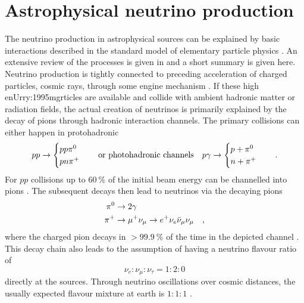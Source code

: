 \section{Astrophysical neutrino production}
  \label{chp:astro_nu_production}
The neutrino production in astrophysical sources can be explained by basic interactions described in the standard model of elementary particle physics \cite{Patrignani:2016xqp,Herrero:1998eq}.
An extensive review of the processes is given in \cite{Gaisser:1990vg,Gaisser:2016uoy,Grupen:2005rx} and a short summary is given here.
Neutrino production is tightly connected to preceding acceleration \cite{FermiShockAcc} of charged particles, cosmic rays, through some engine mechanism \cite{NetzerAGNReview,Beckmann:2013wte,Urry:1995mg}.
If these high enUrry:1995mgrticles are available and collide with ambient hadronic matter or radiation fields, the actual creation of neutrinos is primarily explained by the decay of pions through hadronic interaction channels.
The primary collisions can either happen in protohadronic
\begin{equation}
  p p \rightarrow
    \begin{cases}
      p p \pi^0 \\
      p n \pi^+
    \end{cases}
    \quad\text{or photohadronic channels}\quad
  p \gamma \rightarrow
    \begin{cases}
      p + \pi^0 \\
      n + \pi^+
    \end{cases}
  \quad\text{.}
\end{equation}
For $pp$ collisions up to $\SI{60}{\percent}$ of the initial beam energy can be channelled into pions \cite{Frichter:1997wh}.
The subsequent decays then lead to neutrinos via the decaying pions
\begin{align}
  \pi^0 &\rightarrow 2\gamma \\
  \pi^+ &\rightarrow \mu^+ \nu_\mu \rightarrow e^+ \nu_e \bar{\nu}_\mu \nu_\mu
  \quad\text{,}
\end{align}
where the charged pion decays in $>\SI{99,9}{\percent}$ of the time in the depicted channel \cite{Patrignani:2016xqp}.
This decay chain also leads to the assumption of having a neutrino flavour ratio of
\begin{equation}
  \nu_e : \nu_\mu : \nu_\tau = 1 : 2 : 0
\end{equation}
directly at the sources.
Through neutrino oscillations over cosmic distances, the usually expected flavour mixture at earth is $1:1:1$ \cite{Athar:2005wg,Athar:2000yw}.

